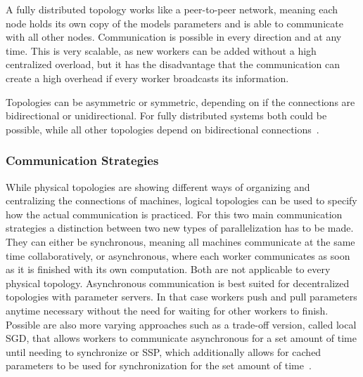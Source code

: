 A fully distributed topology works like a peer-to-peer network, meaning each node holds its own copy of the models parameters and is able to communicate with all other nodes. Communication is possible in every direction and at any time. This is very scalable, as new workers can be added without a high centralized overload, but it has the disadvantage that the communication can create a high overhead if every worker broadcasts its information.

Topologies can be asymmetric or symmetric, depending on if the connections are bidirectional or unidirectional. For fully distributed systems both could be possible, while all other topologies depend on bidirectional connections~\cite{won_tacos_2024}.




\subsubsection*{Communication Strategies}

While physical topologies are showing different ways of organizing and centralizing the connections of machines, logical topologies can be used to specify how the actual communication is practiced.  
For this two main communication strategies a distinction between two new types of parallelization has to be made. They can either be synchronous, meaning all machines communicate at the same time collaboratively, or asynchronous, where each worker communicates as soon as it is finished with its own computation. Both are not applicable to every physical topology. Asynchronous communication is best suited for decentralized topologies with parameter servers. In that case workers push and pull parameters anytime necessary without the need for waiting for other workers to finish.
Possible are also more varying approaches such as a trade-off version, called local \ac{SGD}, that allows workers to communicate asynchronous for a set amount of time until needing to synchronize \cite{verbraeken_survey_2020} or \ac{SSP}, which additionally allows for cached parameters to be used for synchronization for the set amount of time~\cite{tang_communication-efficient_2023}. 

